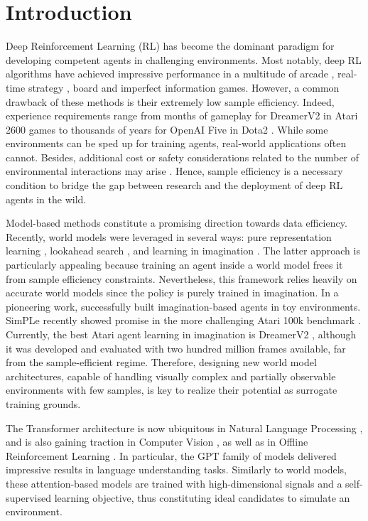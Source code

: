 \section{Introduction}

Deep Reinforcement Learning (RL) has become the dominant paradigm for developing competent agents in challenging environments. Most notably, deep RL algorithms have achieved impressive performance in a multitude of arcade \citep{dqn, muzero, dreamerv2}, real-time strategy \citep{alphastar, dota2}, board \citep{alphago, alphazero, muzero} and imperfect information \citep{pog, rebel} games. However, a common drawback of these methods is their extremely low sample efficiency. Indeed, experience requirements range from months of gameplay for DreamerV2 \citep{dreamerv2} in Atari 2600 games \citep{bellemare13arcade} to thousands of years for OpenAI Five in Dota2 \citep{dota2}. While some environments can be sped up for training agents, real-world applications often cannot. Besides, additional cost or safety considerations related to the number of environmental interactions may arise \citep{aisecurity}. Hence, sample efficiency is a necessary condition to bridge the gap between research and the deployment of deep RL agents in the wild.

Model-based methods \citep{sutton} constitute a promising direction towards data efficiency. Recently, world models were leveraged in several ways: pure representation learning \citep{spr}, lookahead search \citep{muzero, efficientzero}, and learning in imagination \citep{worldmodels, simple, dreamerv1, dreamerv2}. The latter approach is particularly appealing because training an agent inside a world model frees it from sample efficiency constraints. Nevertheless, this framework relies heavily on accurate world models since the policy is purely trained in imagination. In a pioneering work, \citet{worldmodels} successfully built imagination-based agents in toy environments. SimPLe recently showed promise in the more challenging Atari 100k benchmark \citep{simple}. Currently, the best Atari agent learning in imagination is DreamerV2 \citep{dreamerv2}, although it was developed and evaluated with two hundred million frames available, far from the sample-efficient regime. Therefore, designing new world model architectures, capable of handling visually complex and partially observable environments with few samples, is key to realize their potential as surrogate training grounds.

The Transformer architecture \citep{vaswani} is now ubiquitous in Natural Language Processing \citep{bert, radford_gpt2, brown_gpt3, t5}, and is also gaining traction in Computer Vision \citep{vit, masked_autoencoders_he}, as well as in Offline Reinforcement Learning \citep{trajectory_transformer, decision_transformer}. In particular, the GPT \citep{gpt1, radford_gpt2, brown_gpt3} family of models delivered impressive results in language understanding tasks. Similarly to world models, these attention-based models are trained with high-dimensional signals and a self-supervised learning objective, thus constituting ideal candidates to simulate an environment.

